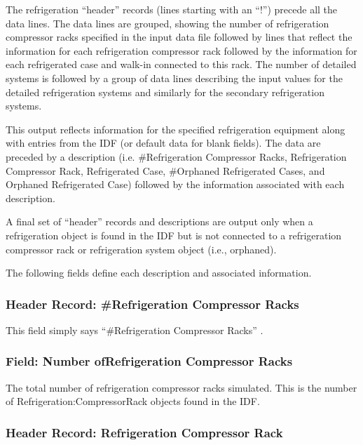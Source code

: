 The refrigeration ``header'' records (lines starting with an ``!'') precede all the data lines. The data lines are grouped, showing the number of refrigeration compressor racks specified in the input data file followed by lines that reflect the information for each refrigeration compressor rack followed by the information for each refrigerated case and walk-in connected to this rack. The number of detailed systems is followed by a group of data lines describing the input values for the detailed refrigeration systems and similarly for the secondary refrigeration systems.

This output reflects information for the specified refrigeration equipment along with entries from the IDF (or default data for blank fields). The data are preceded by a description (i.e. \#Refrigeration Compressor Racks, Refrigeration Compressor Rack, Refrigerated Case, \#Orphaned Refrigerated Cases, and Orphaned Refrigerated Case) followed by the information associated with each description.

A final set of ``header'' records and descriptions are output only when a refrigeration object is found in the IDF but is not connected to a refrigeration compressor rack or refrigeration system object (i.e., orphaned).

The following fields define each description and associated information.

\subsubsection{Header Record: \#Refrigeration Compressor Racks}\label{header-record-refrigeration-compressor-racks}

This field simply says ``\#Refrigeration Compressor Racks'' .

\subsubsection{Field: Number ofRefrigeration Compressor Racks}\label{field-number-ofrefrigeration-compressor-racks}

The total number of refrigeration compressor racks simulated. This is the number of Refrigeration:CompressorRack objects found in the IDF.

\subsubsection{Header Record: Refrigeration Compressor Rack}\label{header-record-refrigeration-compressor-rack}

